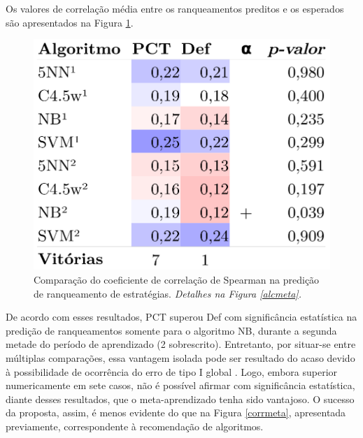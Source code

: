 Os valores de correlação média entre os ranqueamentos preditos e os esperados são apresentados na Figura \ref{stcorr}.
\begin{figure}
\centering
\includegraphics[scale=0.4]{images/metastcorr.pdf}
\caption[Comparação da correlação na predição de ranqueamento de estratégias.]{Comparação do coeficiente de correlação de Spearman na predição de ranqueamento de estratégias.
\textit{Detalhes na Figura \ref{alcmeta}.}}
\label{stcorr}
\end{figure}
De acordo com esses resultados, PCT superou Def com significância estatística na predição de ranqueamentos somente para o algoritmo NB, durante a segunda metade do período de aprendizado (2 sobrescrito).
Entretanto, por situar-se entre múltiplas comparações, essa vantagem isolada pode ser resultado do acaso devido à possibilidade de ocorrência do erro de tipo I global \cite{journals/jmlr/Demsar06}. %
Logo, embora superior numericamente em sete casos, não é possível afirmar com significância estatística, diante desses resultados, que o meta-aprendizado tenha sido vantajoso.
O sucesso da proposta, assim, é menos evidente do que na Figura \ref{corrmeta}, apresentada previamente, correspondente à recomendação de algoritmos.

